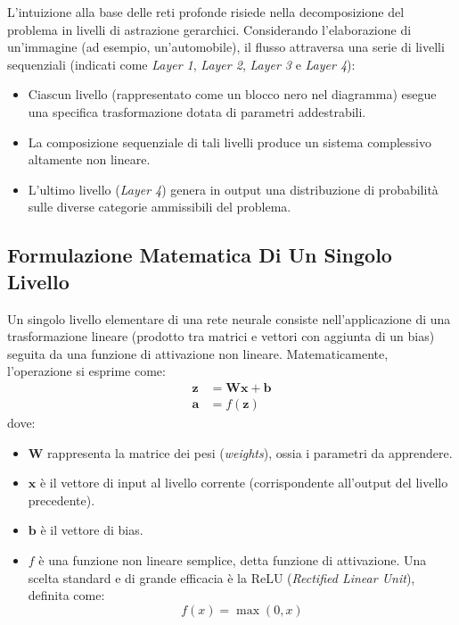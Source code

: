 ﻿\documentclass[11pt, a4paper]{article}
\begin{document}
L'intuizione alla base delle reti profonde risiede nella decomposizione del problema in livelli di astrazione gerarchici. Considerando l'elaborazione di un'immagine (ad esempio, un'automobile), il flusso attraversa una serie di livelli sequenziali (indicati come \emph{Layer 1}, \emph{Layer 2}, \emph{Layer 3} e \emph{Layer 4}):
\begin{itemize}[noitemsep]
    \item Ciascun livello (rappresentato come un blocco nero nel diagramma) esegue una specifica trasformazione dotata di parametri addestrabili.
    \item La composizione sequenziale di tali livelli produce un sistema complessivo altamente non lineare.
    \item L'ultimo livello (\emph{Layer 4}) genera in output una distribuzione di probabilità sulle diverse categorie ammissibili del problema.
\end{itemize}

\newpage

\subsection{Formulazione Matematica Di Un Singolo Livello}

Un singolo livello elementare di una rete neurale consiste nell'applicazione di una trasformazione lineare (prodotto tra matrici e vettori con aggiunta di un bias) seguita da una funzione di attivazione non lineare. Matematicamente, l'operazione si esprime come:
\begin{align*}
\bm{z} &= \bm{W}\bm{x} + \bm{b} \\
\bm{a} &= f(\bm{z})
\end{align*}
dove:
\begin{itemize}[noitemsep]
    \item $\bm{W}$ rappresenta la matrice dei pesi (\emph{weights}), ossia i parametri da apprendere.
    \item $\bm{x}$ è il vettore di input al livello corrente (corrispondente all'output del livello precedente).
    \item $\bm{b}$ è il vettore di bias.
    \item $f$ è una funzione non lineare semplice, detta funzione di attivazione. Una scelta standard e di grande efficacia è la ReLU (\emph{Rectified Linear Unit}), definita come:
    \[ f(x) = \max(0, x) \]
\end{itemize}

\end{document}
